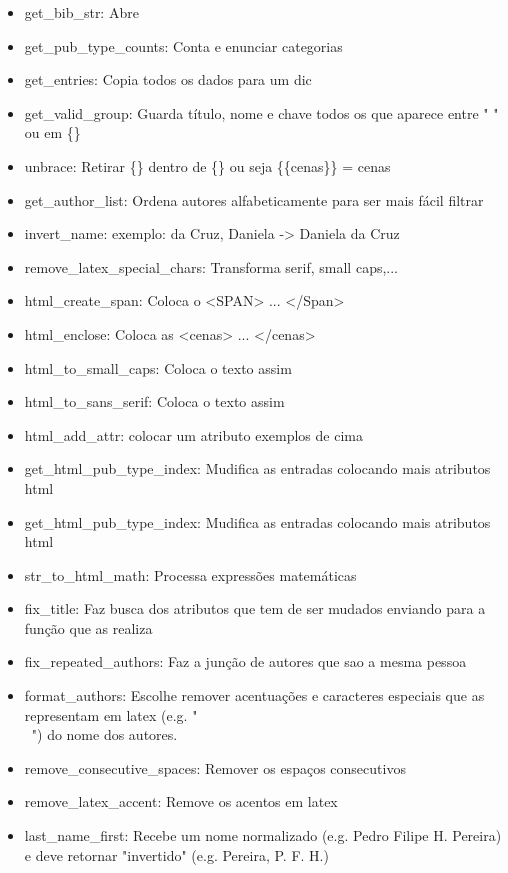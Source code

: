 \documentclass[11pt,a4paper]{report}
\begin{document}
\begin{itemize}
    \item get\_bib\_str: Abre \bib
    \item get\_pub\_type\_counts: Conta e enunciar categorias
    \item get\_entries: Copia todos os dados \bib para um dic
    \item get\_valid\_group: Guarda título, nome e chave todos os que aparece entre " " ou em \{\}
    \item  unbrace: Retirar \{\} dentro de \{\} ou seja \{\{cenas\}\} = cenas
    \item get\_author\_list: Ordena autores alfabeticamente para ser mais fácil filtrar
    \item invert\_name: exemplo: da Cruz, Daniela -> Daniela da Cruz
    \item remove\_latex\_special\_chars: Transforma serif, small caps,... 
    \item html\_create\_span: Coloca o <SPAN> ... </Span>
    \item html\_enclose:  Coloca as <cenas> ... </cenas>
    \item html\_to\_small\_caps: Coloca o texto assim
    \item  html\_to\_sans\_serif: Coloca o texto assim
    \item  html\_add\_attr: colocar um atributo exemplos de cima
    \item get\_html\_pub\_type\_index: Mudifica as entradas colocando mais atributos html
    \item get\_html\_pub\_type\_index: Mudifica as entradas colocando mais atributos html
    \item str\_to\_html\_math: Processa expressões matemáticas
    \item fix\_title: Faz busca dos atributos que tem de ser mudados enviando para a função que as realiza
    \item fix\_repeated\_authors: Faz a junção de autores que sao a mesma pessoa
    \item format\_authors: Escolhe remover acentuações e caracteres especiais  que as representam em latex (e.g. "\\~") do nome dos autores.
    \item remove\_consecutive\_spaces: Remover os espaços consecutivos 
    \item remove\_latex\_accent: Remove os acentos em latex 
    \item last\_name\_first: Recebe um nome normalizado (e.g. Pedro Filipe H. Pereira) e deve retornar "invertido" (e.g. Pereira, P. F. H.)

\end{itemize}
\end{document}
